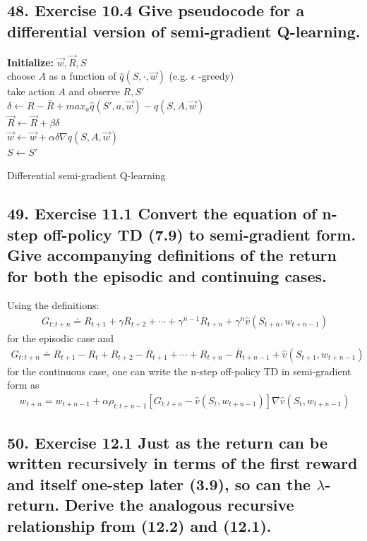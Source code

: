 \documentclass[10pt,a4paper]{article}
\begin{document}
\subsection*{48. Exercise 10.4 Give pseudocode for a differential version of semi-gradient Q-learning.}
\begin{algorithm}[ht]
\textbf{Initialize:}
$\vec{w}, \vec{R}, S$\\
	{
		choose $A$ as a function of $\hat{q}(S, \cdot , \vec{w})$ (e.g. $\epsilon$ -greedy)\\
		take action $A$ and observe $R, S'$ \\
		$\delta \leftarrow R-\overline{R} + max_a \hat{q}(S', a, \vec{w}) - \hat{q}(S, A, \vec{w})$\\
		$\vec{R} \leftarrow \vec{R} + \beta \delta$\\
		$\vec{w} \leftarrow \vec{w} + \alpha \delta \nabla q(S, A, \vec{w})$\\
		$S \leftarrow S'$
	}	
 \caption{Differential semi-gradient Q-learning}
\end{algorithm}

\subsection*{49. Exercise 11.1 Convert the equation of n-step off-policy TD (7.9) to semi-gradient form. Give accompanying definitions of the return for both the episodic and continuing cases.}
Using the definitions:
\begin{align*}
G_{t:t+n} \doteq R_{t+1} + \gamma R_{t+2} + \cdots + \gamma^{n-1}R_{t+n} + \gamma^n \hat{v} (S_{t+n}, w_{t+n-1})\end{align*}
for the episodic case and
\begin{align*}
G_{t:t+n} \doteq R_{t+1} - {R}_t + R_{t+2} - \overline{R}_{t+1} + \cdots + R_{t+n} - \overline{R}_{t+n-1} + \hat{v}(S_{t+1}, w_{t+n-1})
\end{align*}
for the continuous case, one can write the n-step off-policy TD in semi-gradient form as
\begin{align*}
w_{t+n} = w_{t+n-1} + \alpha \rho_{t:t+n-1}[G_{t:t+n} - \hat{v}(S_t, w_{t+n-1})]\nabla \hat{v}(S_t, w_{t+n-1})
\end{align*}


\subsection*{50. Exercise 12.1 Just as the return can be written recursively in terms of the first reward and itself one-step later (3.9), so can the $\lambda$-return. Derive the analogous recursive relationship from (12.2) and (12.1).}
\newpage
\end{document}
